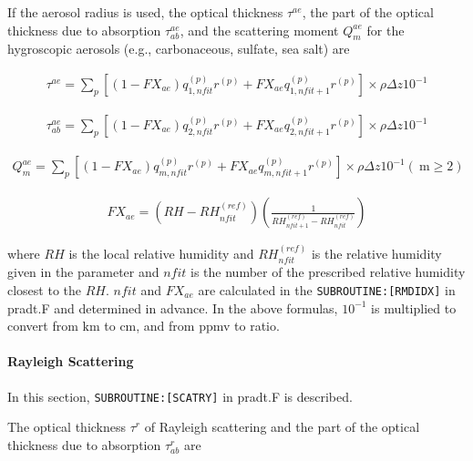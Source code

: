 If the aerosol radius is used, the optical thickness \(\tau^{a e}\), the part of the optical thickness due to absorption \(\tau_{ab}^{a e}\), and the scattering moment \(Q_{m}^{a e}\) for the
hygroscopic aerosols (e.g., carbonaceous, sulfate, sea salt) are

\begin{eqnarray}
\tau^{a e}=\sum_{p}\left[\left(1-F X_{a e}\right) q_{1, n f i t}^{(p)} r^{(p)}+F X_{a e} q_{1, n f i t+1}^{(p)} r^{(p)}\right] \times \rho \Delta z 10^{-1}
\end{eqnarray}

\begin{eqnarray}
\tau_{ab}^{a e}=\sum_{p}\left[\left(1-F X_{a e}\right) q_{2, n f i t}^{(p)} r^{(p)}+F X_{a e} q_{2, n f i t+1}^{(p)} r^{(p)}\right] \times \rho \Delta z 10^{-1}
\end{eqnarray}

\begin{eqnarray}
Q_{m}^{a e}=\sum_{p}\left[\left(1-F X_{a e}\right) q_{m, n f i t}^{(p)} r^{(p)}+F X_{a e} q_{m, n f i t+1}^{(p)} r^{(p)}\right] \times \rho \Delta z 10^{-1}(\mathrm{~m} \geq 2)
\end{eqnarray}

\begin{eqnarray}
F X_{a e}=\left(R H-R H_{n f i t}^{(r e f)}\right)\left(\frac{1}{R H_{n f i t+1}^{(r e f)}-R H_{n f i t}^{(r e f)}}\right)
\end{eqnarray}

where \(RH\) is the local relative humidity and \(R H_{n f i t}^{(r e f)}\) is the relative humidity given in the parameter and \(nfit\) is the number of the prescribed relative humidity closest to
the \(RH\). \(nfit\) and \(FX_{ae}\) are calculated in the \texttt{SUBROUTINE:{[}RMDIDX{]}} in pradt.F and determined in advance. In the above formulas, \(10^{-1}\) is multiplied to convert from
\(\mathrm{km}\) to \(\mathrm{cm}\), and from ppmv to ratio.

\hypertarget{rayleigh-scattering}{%
\paragraph{Rayleigh Scattering}\label{rayleigh-scattering}}

In this section, \texttt{SUBROUTINE:{[}SCATRY{]}} in pradt.F is described.

The optical thickness \(\tau^{r}\) of Rayleigh scattering and the part of the optical thickness due to absorption \(\tau_{ab}^{r}\) are

